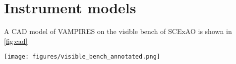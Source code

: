 \section{Instrument models\label{sec:models}}

A CAD model of VAMPIRES on the visible bench of SCExAO is shown in \autoref{fig:cad}


\begin{figure*}
    \centering
    \texttt{[image: figures/visible\_bench\_annotated.png]}
    \caption{SCExAO visible bench including the PyWFS, FIRST injection, and VAMPIRES. VAMPIRES optics are labeled in orange and FIRST/PyWFS optics are labeled in red. The total size of the optical table shown is \SI{120}{\cm} by \SI{90}{\cm}. Parts of the baffling around VAMPIRES optics as well as the optical bench enclosure are hidden for clarity.\label{fig:cad}}
\end{figure*}
